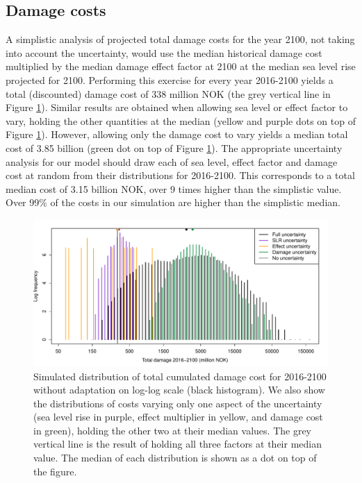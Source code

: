 \documentclass[note,screen,british,11pt]{nrdoc}
\begin{document}
\subsection{Damage costs}
A simplistic analysis of projected total damage costs for the year 2100, not taking into account the uncertainty, would use  the median  historical damage cost multiplied by  the median damage effect factor at 2100 at the median sea level rise projected for 2100. Performing this exercise for every year 2016-2100 yields a total (discounted) damage cost of 338 million NOK (the grey vertical line in Figure \ref{fig:costunc}). Similar results are obtained when allowing sea level or effect factor to vary, holding the other quantities at the median (yellow and purple dots on top of Figure \ref{fig:costunc}). However, allowing only the damage cost to vary yields a median total cost of 3.85 billion (green dot on top of Figure \ref{fig:costunc}). The appropriate uncertainty analysis for our model should draw each of sea level, effect factor and damage cost at random from their distributions for 2016-2100. This corresponds to a total median cost of 3.15 billion NOK, over 9 times higher than the simplistic value. Over 99\% of the costs in our simulation are higher than the simplistic median.

\begin{figure}[!hbpt]
\begin{center}
\includegraphics[width=\linewidth]{UncertaintyLog.pdf}
\caption{Simulated distribution of total cumulated damage cost for 2016-2100 without adaptation on log-log scale (black histogram). We also show the distributions of costs varying only one aspect of the uncertainty (sea level rise in purple, effect multiplier in yellow, and damage cost in green), holding the other two at their median values. The grey vertical line is the result of holding all three factors at their median value. The median of each distribution is shown as a dot on top of the figure.} 
\label{fig:costunc}
\end{center}
\end{figure}
\end{document}
